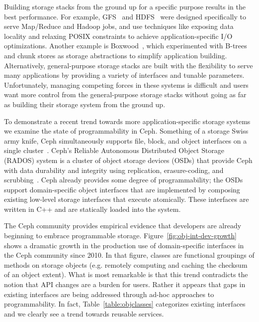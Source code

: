 \documentclass[preprint]{sigplanconf-eurosys}
\begin{document}
Building storage stacks from the ground up for a specific purpose results in
the best performance. For example, GFS~\cite{ghemawat:sosp03} and
HDFS~\cite{shvachko:msst10} were designed specifically to serve Map/Reduce and
Hadoop jobs, and use techniques like exposing data locality and relaxing POSIX
constraints to achieve application-specific I/O optimizations. Another example
is Boxwood~\cite{maccormick:osdi04}, which experimented with B-trees
and chunk stores as storage abstractions to simplify application building.
Alternatively, general-purpose storage stacks are built with the flexibility to
serve many applications by providing a variety of interfaces and tunable
parameters.  Unfortunately, managing competing forces in these systems is
difficult and users want more control from the general-purpose storage stacks
without going as far as building their storage system from the ground up.

To demonstrate a recent trend towards more application-specific storage systems
we examine the state of programmability in Ceph. Something of a storage Swiss
army knife, Ceph simultaneously supports file, block, and object interfaces on
a single cluster~\cite{ceph_contributors_ceph_2010}. Ceph's Reliable Autonomous
Distributed Object Storage (RADOS) system is a cluster of object storage
devices (OSDs) that provide Ceph with data durability and integrity using
replication, erasure-coding, and scrubbing~\cite{weil_rados_2007}. Ceph already
provides some degree of programmability; the OSDs support domain-specific
object interfaces that are implemented by composing existing low-level storage
interfaces that execute atomically. These interfaces are written in C++ and are
statically loaded into the system.

The Ceph community provides empirical evidence that developers are already
beginning to embrace programmable storage. Figure~\ref{fig:obj-int-dev-growth}
shows a dramatic growth in the production use of domain-specific interfaces in
the Ceph community since 2010. In that figure, classes are functional groupings
of methods on storage objects (e.g. remotely computing and caching the checksum
of an object extent).  What is most remarkable is that this trend contradicts
the notion that API changes are a burden for users.  Rather it appears that
gaps in existing interfaces are being addressed through ad-hoc approaches to
programmability. In fact, Table~\ref{table:objclasses} categorizes existing
interfaces and we clearly see a trend towards reusable services.
\end{document}
